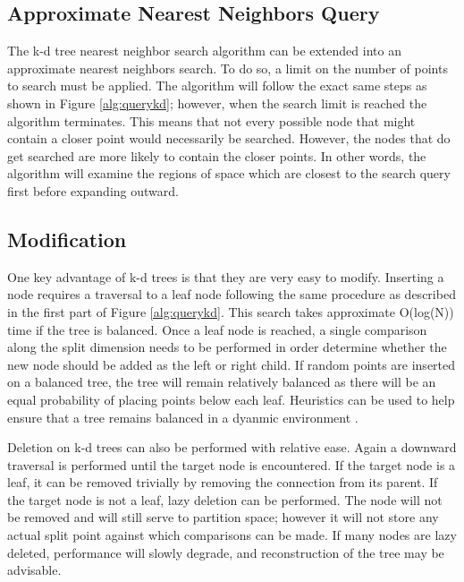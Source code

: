 \subsection{Approximate Nearest Neighbors Query}

The k-d tree nearest neighbor search algorithm can be extended into an approximate nearest neighbors search.  To do so, a limit on the number of points to search must be applied.  The algorithm will follow the exact same steps as shown in Figure \ref{alg:querykd}; however, when the search limit is reached the algorithm terminates.  This means that not every possible node that might contain a closer point would necessarily be searched.  However, the nodes that do get searched are more likely to contain the closer points.  In other words, the algorithm will examine the regions of space which are closest to the search query first before expanding outward.

\subsection{Modification}
\label{sec:kdmod}

One key advantage of k-d trees is that they are very easy to modify.  Inserting a node requires a traversal to a leaf node following the same procedure as described in the first part of Figure \ref{alg:querykd}.  This search takes approximate O(log(N)) time if the tree is balanced.  Once a leaf node is reached, a single comparison along the split dimension needs to be performed in order determine whether the new node should be added as the left or right child.  If random points are inserted on a balanced tree, the tree will remain relatively balanced as there will be an equal probability of placing points below each leaf.  Heuristics can be used to help ensure that a tree remains balanced in a dyanmic environment \citep{hunt2006fast}.

Deletion on k-d trees can also be performed with relative ease.  Again a downward traversal is performed until the target node is encountered. If the target node is a leaf, it can be removed trivially by removing the connection from its parent.  If the target node is not a leaf, lazy deletion can be performed.  The node will not be removed and will still serve to partition space; however it will not store any actual split point against which comparisons can be made.  If many nodes are lazy deleted, performance will slowly degrade, and reconstruction of the tree may be advisable.

